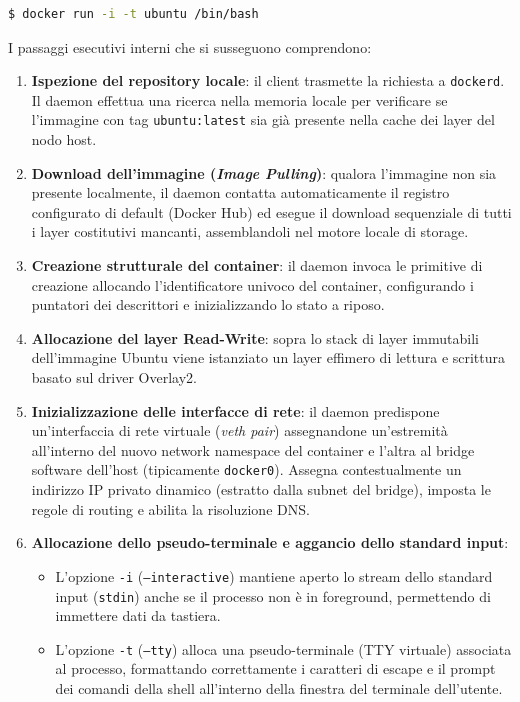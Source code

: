\documentclass[11pt, a4paper]{article}
\begin{document}
\begin{lstlisting}[language=bash]
$ docker run -i -t ubuntu /bin/bash
\end{lstlisting}

I passaggi esecutivi interni che si susseguono comprendono:
\begin{enumerate}
    \item \textbf{Ispezione del repository locale}: il client trasmette la richiesta a \texttt{dockerd}. Il daemon effettua una ricerca nella memoria locale per verificare se l'immagine con tag \texttt{ubuntu:latest} sia già presente nella cache dei layer del nodo host.
    \item \textbf{Download dell'immagine (\emph{Image Pulling})}: qualora l'immagine non sia presente localmente, il daemon contatta automaticamente il registro configurato di default (Docker Hub) ed esegue il download sequenziale di tutti i layer costitutivi mancanti, assemblandoli nel motore locale di storage.
    \item \textbf{Creazione strutturale del container}: il daemon invoca le primitive di creazione allocando l'identificatore univoco del container, configurando i puntatori dei descrittori e inizializzando lo stato a riposo.
    \item \textbf{Allocazione del layer Read-Write}: sopra lo stack di layer immutabili dell'immagine Ubuntu viene istanziato un layer effimero di lettura e scrittura basato sul driver Overlay2.
    \item \textbf{Inizializzazione delle interfacce di rete}: il daemon predispone un'interfaccia di rete virtuale (\emph{veth pair}) assegnandone un'estremità all'interno del nuovo network namespace del container e l'altra al bridge software dell'host (tipicamente \texttt{docker0}). Assegna contestualmente un indirizzo IP privato dinamico (estratto dalla subnet del bridge), imposta le regole di routing e abilita la risoluzione DNS.
    \item \textbf{Allocazione dello pseudo-terminale e aggancio dello standard input}:
    \begin{itemize}
        \item L'opzione \texttt{-i} (\texttt{--interactive}) mantiene aperto lo stream dello standard input (\texttt{stdin}) anche se il processo non è in foreground, permettendo di immettere dati da tastiera.
        \item L'opzione \texttt{-t} (\texttt{--tty}) alloca una pseudo-terminale (TTY virtuale) associata al processo, formattando correttamente i caratteri di escape e il prompt dei comandi della shell all'interno della finestra del terminale dell'utente.

\end{itemize}
\end{enumerate}
\end{document}
